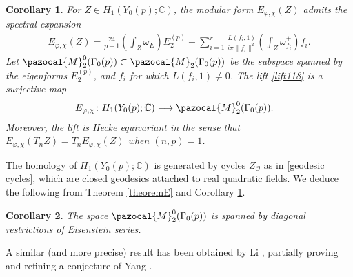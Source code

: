 \documentclass[a4paper,11pt]{amsart} %
\newcommand{\8}{\infty}
\newcommand{\vbf}{\mathbf{v}}
\newcommand{\C}{\mathbb{C}}
\newcommand{\Ocal}{\mathcal{O}}
\newcommand{\Mcal}{\pazocal{M}}
\theoremstyle{mytheoremstyle}
\newtheorem{cor}{Corollary}[thm]
\theoremstyle{remark}
\numberwithin{equation}{section}
\begin{document}
\begin{cor} \label{corollaryH} For $Z \in H_1(Y_0(p);\C)$, the modular form $E_{\varphi, \chi}(Z)$ admits the spectral expansion
\begin{align}
    E_{\varphi, \chi}(Z) = \frac{24}{p-1} \left ( \int_Z \omega_E \right ) E_2^{(p)}- \sum_{i=1}^r \frac{L(f_i,1)}{i\pi\lVert f_i \rVert^2}\left ( \int_Z\omega_{f_i}^+\right) f_i.
\end{align}
Let $\Mcal_2^{0}(\Gamma_0(p))\subset \Mcal_2(\Gamma_0(p))$ be the subspace spanned by the eigenforms $E_2^{(p)}$, and $f_i$ for which $L(f_i,1) \neq 0$. The lift \eqref{lift118} is a surjective map
\begin{align}
E_{\varphi, \chi} \colon H_{1}(Y_0(p);\C)& \longrightarrow \Mcal^0_2(\Gamma_0(p)).
\end{align}
Moreover, the lift is Hecke equivariant in the sense that $E_{\varphi, \chi}(T_nZ)=T_nE_{\varphi, \chi}(Z)$ when $(n,p)=1$.
\end{cor}

The homology of $H_{1}(Y_0(p);\C)$ is generated by cycles $Z_\Ocal$ as in \eqref{geodesic cycles}, which are closed geodesics attached to real quadratic fields. We deduce the following from Theorem \ref{theoremE} and Corollary \ref{corollaryH}.
\begin{cor} \label{corollaryG} The space $\Mcal_2^{0}(\Gamma_0(p))$ is spanned by diagonal restrictions of Eisenstein series.
\end{cor}
A similar (and more precise) result has been obtained by Li \cite{li_restriction}, partially proving and refining a conjecture of Yang \cite{yang}.



\end{document}

